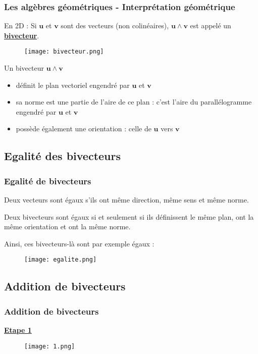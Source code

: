 \documentclass{beamer}
\newcommand{\sg}[1]{\textbf{\underline{#1}}}
\begin{document}
\begin{frame}
\frametitle{Les algèbres géométriques - Interprétation géométrique}
 En 2D : Si $\bm{u}$ et $\bm{v}$ sont des vecteurs (non colinéaires), $\bm{u}\wedge \bm{v}$ est appelé un \sg{bivecteur}.\bigskip \pause
   \begin{figure}[!ht]
\centering
\texttt{[image: bivecteur.png]}
\end{figure}
Un bivecteur $\bm{u} \wedge \bm{v}$ \begin{itemize}
\item définit le plan vectoriel engendré par $\bm{u}$ et $\bm{v}$ \pause 
\item sa norme est une partie de l'aire de ce plan : c'est l'aire du parallélogramme engendré par $\bm{u}$ et $\bm{v}$ \pause 
\item possède également une orientation : celle de $\bm{u}$ vers $\bm{v}$
\end{itemize}
\end{frame}
   
\subsection{Egalité des bivecteurs}
\begin{frame}
\frametitle{Egalité de bivecteurs}
Deux vecteurs sont égaux s'ils ont même direction, même sens et même norme. \pause 

Deux bivecteurs sont égaux si et seulement si ils définissent le même plan, ont la même orientation et ont la même norme. \pause 

Ainsi, ces bivecteurs-là sont par exemple égaux : 

\begin{figure}[!ht]
\centering
\texttt{[image: egalite.png]}
\label{egalite}
\end{figure}   
\end{frame}

\subsection{Addition de bivecteurs}
\begin{frame}
\frametitle{Addition de bivecteurs}
\pause
\begin{center}
{\sg{Etape 1}} 
\end{center}
\begin{figure}[!ht]
\centering
\texttt{[image: 1.png]}
\end{figure}   
\end{frame}
\end{document}
